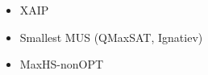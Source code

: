 \begin{itemize}
    \item XAIP
    \item Smallest MUS (QMaxSAT, Ignatiev)
    \item MaxHS-nonOPT
\end{itemize}